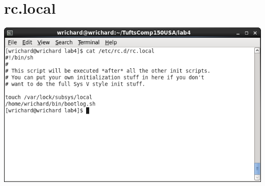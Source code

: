 \documentclass[a4paper,10pt]{article}
\begin{document}
\section{rc.local}
  \begin{center}
  \includegraphics[width=\linewidth]{./rclocal.png}
  \end{center}
\end{document}
